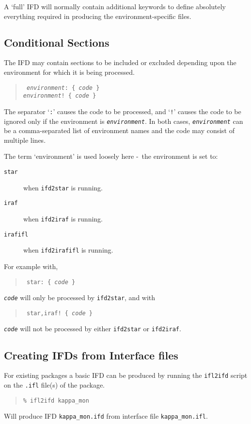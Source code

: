 \documentclass[twoside,11pt]{article}
\newcommand{\htmlref}[2]{#1}
\newcommand{\xlabel}[1]{}
\newcommand{\dash}{--}
\renewcommand{\dash}{-}
\begin{document}
A `full' IFD will normally contain additional keywords to define absolutely
everything required in producing the environment-specific files.

\subsection{\xlabel{conditional_sections}\label{conditional_sections}Conditional 
Sections}
The IFD may contain sections to be included or excluded depending upon the 
environment for which it is being processed. 
\begin{quote} {\tt
\textit{environment}: \{ \textit{code} \}\\
\textit{environment}! \{ \textit{code} \}
} \end{quote}
The separator `\texttt{:}' causes the code to be processed, and `\texttt{!}' 
causes the code to be ignored only if the environment is 
\texttt{\textit{environment}}.
In both cases, \texttt{\textit{environment}} can be a comma-separated list of 
environment names and the code may consist of multiple lines.

The term `environment' is used loosely here \dash\ the environment is set to:
\begin{description}
\item[\texttt{star}] when \htmlref{\texttt{ifd2star}}{ifd2star} is running.
\item[\texttt{iraf}] when \htmlref{\texttt{ifd2iraf}}{ifd2iraf} is running.
\item[\texttt{irafifl}] when \htmlref{\texttt{ifd2irafifl}}{ifd2irafifl} is 
running.
\end{description}

For example with, 
\begin{quote} {\tt
star: \{ \textit{code} \}
} \end{quote}
\texttt{\textit{code}} will only be processed by \texttt{ifd2star}, and with
\begin{quote} {\tt
star,iraf! \{ \textit{code} \}
} \end{quote}
\texttt{\textit{code}} will not be processed by either \texttt{ifd2star} or 
\texttt{ifd2iraf}.

\subsection{\xlabel{creating_ifds_from_interface_files}Creating IFDs from 
Interface files}
For existing packages a basic IFD can be produced by running the
\texttt{ifl2ifd} script on the \texttt{.ifl} file(s) of the package.
\begin{quote} \begin{verbatim}
% ifl2ifd kappa_mon
\end{verbatim} \end{quote}
Will produce IFD \texttt{kappa\_mon.ifd} from interface file 
\texttt{kappa\_mon.ifl}.
\end{document}
